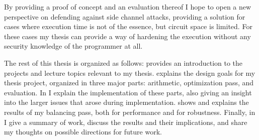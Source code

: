 By providing a proof of concept and an evaluation thereof I hope to open a new perspective on defending against side channel attacks, providing a solution for cases where execution time is not of the essence, but circuit space is limited.
For these cases my thesis can provide a way of hardening the execution without any security knowledge of the programmer at all.

The rest of this thesis is organized as follows:
 provides an introduction to the projects and lecture topics relevant to my thesis.
 explains the design goals for my thesis project, organized in three major parts: arithmetic, optimization pass, and evaluation.
In  I explain the implementation of these parts, also giving an insight into the larger issues that arose during implementation.
 shows and explains the results of my balancing pass, both for performance and for robustness.
Finally, in  I give a summary of work, discuss the results and their implications, and share my thoughts on possible directions for future work.
